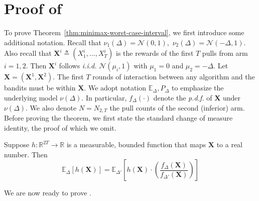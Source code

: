\documentclass[nonblindrev]{informs3_noinforms}
\begin{document}
\section{Proof of }\label{sec: proof of minimax worst case}
To prove Theorem~\ref{thm:minimax-worst-case-interval}, we first introduce some additional notation. Recall that $\nu_1(\Delta) = \mathcal{N}(0, 1),$ $\nu_2(\Delta) = \mathcal{N}(-\Delta, 1)$. Also recall that $\mathbf{X}^i \triangleq (X^i_1, \dots, X^i_T)$ is the rewards of the first $T$ pulls from arm $i = 1, 2$. Then $\mathbf{X}^i$ follows \textit{i.i.d.} $\mathcal{N}(\mu_i, 1)$ with $\mu_1 = 0$ and $\mu_2 = -\Delta.$ Let $\mathbf{X} = (\mathbf{X}^1, \mathbf{X}^2)$. The first $T$ rounds of interaction between any algorithm and the bandits must be within $\mathbf{X}$. We adopt notation $\mathbb{E}_{\Delta}, P_{\Delta}$ to emphasize the underlying model $\nu(\Delta)$. In particular, $f_{\Delta}(\cdot)$ denote the \emph{p.d.f.} of $\mathbf{X}$ under $\nu(\Delta)$. We also denote $N = N_{2, T}$ the pull counts of the second (inferior) arm. Before proving the theorem, we first state the standard change of measure identity, the proof of which we omit.
\begin{lemma}\label{lem:change-of-measure}
    Suppose $h: \mathbb{R}^{ 2 T} \to \mathbb R$ is a measurable, bounded function that maps $\mathbf{X}$ to a real number. Then
    \[
    \mathbb{E}_{\Delta} [h(\mathbf{X})] = \mathbb{E}_{\Delta'}\left[h(\mathbf{X}) \cdot \left(\frac{f_{\Delta}(\mathbf{X})}{f_{\Delta'}(\mathbf{X})}\right)\right]
    \]
\end{lemma}
 We are now ready to prove .
\end{document}
